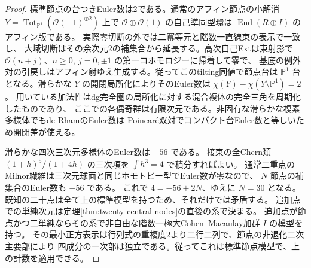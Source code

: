 \begin{proof}
標準節点の台つきEuler数は2である。通常のアフィン節点の小解消
$Y=\operatorname{Tot}_{\mathbb P^1}(\mathcal O(-1)^{\oplus2})$ 上で
$\mathcal O\oplus\mathcal O(1)$ の自己準同型環は $\operatorname{End}(R\oplus I)$ のアフィン版である。
実際零切断の外では二冪等元と階数一直線束の表示で一致し、
大域切断はその余次元2の補集合から延長する。高次自己Extは束射影で
$\mathcal O(n+j)$、$n\ge0,\ j=0,\pm1$ の第一コホモロジーに帰着して零で、
基底の例外対の引戻しはアフィン射ゆえ生成する。従ってこのtilting同値で節点台は
$\mathbb P^1$ 台となる。滑らかな $Y$ の開閉局所化によりそのEuler数は
$\chi(Y)-\chi(Y\setminus\mathbb P^1)=2$。
用いている加法性はdg完全圏の局所化に対する混合複体の完全三角を周期化したものであり、
ここでの各偶奇群は有限次元である。非固有な滑らかな複素多様体でもde RhamのEuler数は
Poincaré双対でコンパクト台Euler数と等しいため開閉差が使える。

滑らかな四次三次元多様体のEuler数は $-56$ である。
接束の全Chern類 $(1+h)^5/(1+4h)$ の三次項を $\int h^3=4$ で積分すればよい。
通常二重点のMilnor繊維は三次元球面と同じホモトピー型でEuler数が零なので、
$N$ 節点の補集合のEuler数も $-56$ である。
これで $4=-56+2N$、ゆえに $N=30$ となる。
既知の二十点は全て上の標準模型を持つため、それだけでは矛盾する。
追加点での単純次元は定理\ref{thm:twenty-central-nodes}の直後の系で決まる。
追加点が節点かつ二単純ならその系で非自由な階数一極大Cohen--Macaulay加群 $I$ の模型を持つ。
その最小正方表示は行列式の重複度2より二行二列で、節点の非退化二次主要部により
四成分の一次部は独立である。従ってこれは標準節点模型で、上の計数を適用できる。
\end{proof}
